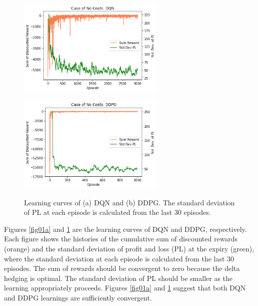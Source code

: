\documentclass[11pt]{article}
\begin{document}
\begin{figure}[htb]
 \begin{minipage}{0.5\hsize}
  \begin{center}
   \includegraphics[width=70mm]{../fig/fig01a.png}
  \end{center}
  \label{fig01a}
 \end{minipage}
 \begin{minipage}{0.5\hsize}
  \begin{center}
   \includegraphics[width=70mm]{../fig/fig01b.png}
  \end{center}
  \label{fig01b}
 \end{minipage}
 \caption{Learning curves of (a) DQN and (b) DDPG. The standard deviation of PL at each episode is calculated from the last 30 episodes.}
\end{figure}

Figures \ref{fig01a} and \ref{fig01b} are the learning curves of DQN and DDPG, respectively. Each figure shows the histories of the cumulative sum of discounted rewards (orange) and the standard deviation of profit and loss (PL) at the expiry (green), where the standard deviation at each episode is calculated from the last 30 episodes. The sum of rewards should be convergent to zero because the delta hedging is optimal. The standard deviation of PL should be smaller as the learning appropriately proceeds. Figures \ref{fig01a} and \ref{fig01b} suggest that both DQN and DDPG learnings are sufficiently convergent.
\end{document}
